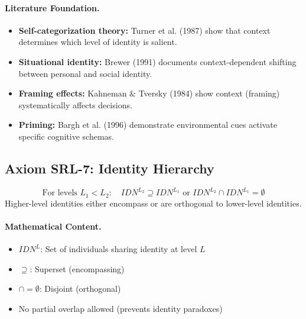 \paragraph{Literature Foundation.}
\begin{itemize}
\item \textbf{Self-categorization theory:} Turner et al. (1987) show that context 
determines which level of identity is salient.
\item \textbf{Situational identity:} Brewer (1991) documents context-dependent 
shifting between personal and social identity.
\item \textbf{Framing effects:} Kahneman \& Tversky (1984) show context 
(framing) systematically affects decisions.
\item \textbf{Priming:} Bargh et al. (1996) demonstrate environmental cues 
activate specific cognitive schemas.
\end{itemize}

\subsection{Axiom SRL-7: Identity Hierarchy}

\begin{tcolorbox}[colback=gray!5!white, colframe=gray!75!black, title=Axiom SRL-7: Identity Hierarchy]
\begin{equation}
\boxed{
\text{For levels } L_1 < L_2: \quad IDN^{L_2} \supseteq IDN^{L_1} \text{ or } IDN^{L_2} \cap IDN^{L_1} = \emptyset
}
\end{equation}
Higher-level identities either encompass or are orthogonal to lower-level identities.
\end{tcolorbox}

\paragraph{Mathematical Content.}
\begin{itemize}
\item $IDN^L$: Set of individuals sharing identity at level $L$
\item $\supseteq$: Superset (encompassing)
\item $\cap = \emptyset$: Disjoint (orthogonal)
\item No partial overlap allowed (prevents identity paradoxes)
\end{itemize}

